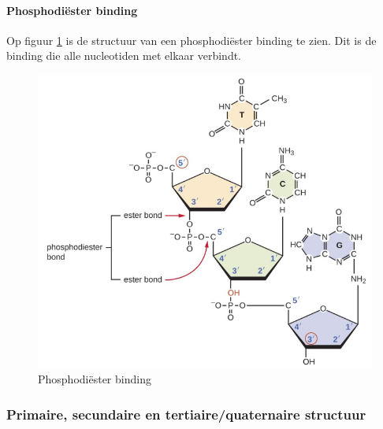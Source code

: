 \documentclass[a4paper,kul]{kulakarticle} %
\begin{document}
\paragraph{Phosphodiëster binding}
Op figuur \ref{fig:esterbinding} is de structuur van een phosphodiëster binding te zien. Dit is de binding die alle nucleotiden met elkaar verbindt. 
\begin{figure}[h]
	\centering
	\includegraphics[width=0.7\linewidth]{EsterBinding}
	\caption[Ester binding]{Phosphodiëster binding}
	\label{fig:esterbinding}
\end{figure}
\newpage
\subsubsection{Primaire, secundaire en tertiaire/quaternaire structuur}
\end{document}
